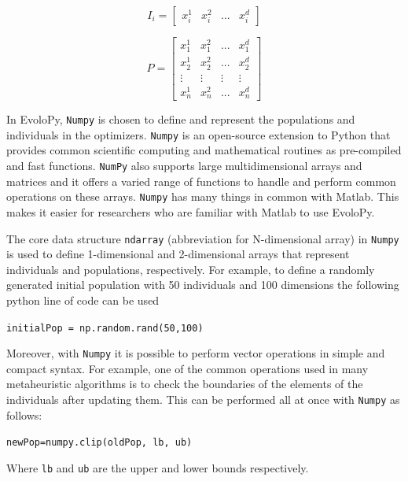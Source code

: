 \documentclass[a4paper,twoside]{article}
\begin{document}
\begin{equation}
I_{i}=[\begin{array}{cccc}
x_{i}^{1} & x_{i}^{2} & ... & x_{i}^{d}\end{array}]
\label{eq:individual}
\end{equation}

\begin{equation}
P=\left[\begin{array}{cccc}
x_{1}^{1} & x_{1}^{2} & ... & x_{1}^{d}\\
x_{2}^{1} & x_{2}^{2} & ... & x_{2}^{d}\\
\vdots & \vdots & \vdots & \vdots\\
x_{n}^{1} & x_{n}^{2} & ... & x_{n}^{d}
\end{array}\right]
\label{eq:population}
\end{equation}

In EvoloPy, \texttt{Numpy} is chosen to define and represent the populations and individuals in the optimizers. \texttt{Numpy} is an open-source extension to Python that provides common scientific computing and mathematical routines as pre-compiled and fast functions. \texttt{NumPy} also supports large multidimensional arrays and matrices and it offers a varied range of functions to handle and perform common operations on these arrays. \texttt{Numpy} has many things in common with Matlab. This makes it easier for researchers who are familiar with Matlab to use EvoloPy. 

The core data structure \texttt{ndarray} (abbreviation for N-dimensional array) in \texttt{Numpy} is used to define 1-dimensional and 2-dimensional arrays that represent individuals and populations, respectively. For example, to define a randomly generated initial population with 50 individuals and 100 dimensions the following python line of code can be used

\texttt{initialPop = np.random.rand(50,100)}


Moreover, with \texttt{Numpy} it is possible to perform vector operations in simple and compact syntax. For example, one of the common operations used in many metaheuristic algorithms is to check the boundaries of the elements of the individuals after updating them. This can be performed all at once with \texttt{Numpy} as follows:

\texttt{newPop=numpy.clip(oldPop, lb, ub)}

Where \texttt{lb} and \texttt{ub} are the upper and lower bounds respectively.
\end{document}
